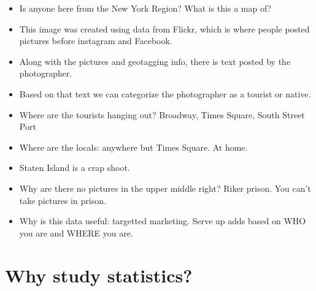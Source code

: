 \documentclass[slidestop,compress,mathserif,12pt,t,professionalfonts,xcolor=table]{beamer}
\begin{document}
\begin{frame}
{  \begin{itemize}
  \item Is anyone here from the New York Region?  What is this a map of?
  \item This image was created using data from Flickr, which is where people posted pictures before instagram and Facebook.
  \item Along with the pictures and geotagging info, there is text posted by the photographer.
  \item Based on that text we can categorize the photographer as a tourist or native.
  \item Where are the tourists hanging out? Broadway, Times Square, South Street Port
  \item Where are the locals: anywhere but Times Square.  At home.
  \item Staten Island is a crap shoot.
  \item Why are there no pictures in the upper middle right?  Riker prison.  You can't take pictures in prison.
  \item Why is this data useful: targetted marketing.  Serve up adds based on WHO you are and WHERE you are.
  \end{itemize}

}

\end{frame}


\section{Why study statistics?}

\end{document}
